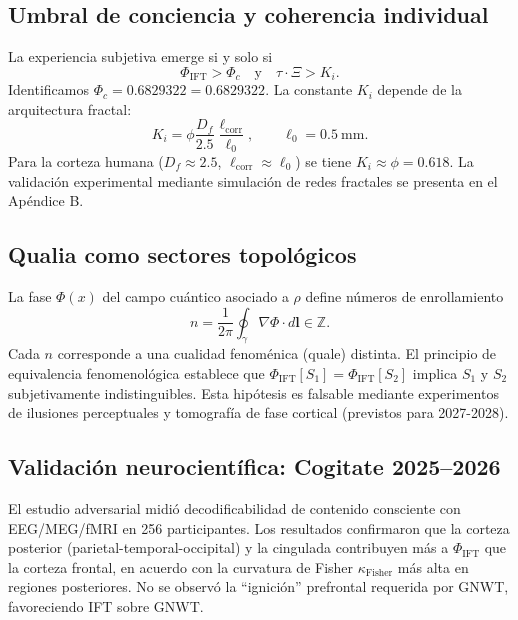 \documentclass[12pt, a4paper]{article}
\theoremstyle{miuThm}
\theoremstyle{remark}
\newcommand{\DeltaCOD}{0.6829322}
\begin{document}
\subsection{Umbral de conciencia y coherencia individual}
La experiencia subjetiva emerge si y solo si
\begin{equation}
\Phi_{\text{IFT}} > \Phi_c \quad \text{y} \quad \tau\cdot\Xi > K_i.
\end{equation}
Identificamos $\Phi_c = \DeltaCOD = 0.6829322$. La constante $K_i$ depende de la arquitectura fractal:
\begin{equation}
\boxed{ K_i = \phi \frac{D_f}{2.5} \frac{\ell_{\text{corr}}}{\ell_0}, \qquad \ell_0 = 0.5\ \text{mm} }.
\end{equation}
Para la corteza humana ($D_f \approx 2.5$, $\ell_{\text{corr}} \approx \ell_0$) se tiene $K_i \approx \phi = 0.618$. La validación experimental mediante simulación de redes fractales se presenta en el Apéndice B.

\subsection{Qualia como sectores topológicos}
La fase $\Phi(x)$ del campo cuántico asociado a $\rho$ define números de enrollamiento
\begin{equation}
n = \frac{1}{2\pi} \oint_\gamma \nabla\Phi \cdot d\mathbf{l} \in \mathbb{Z}.
\end{equation}
Cada $n$ corresponde a una cualidad fenoménica (quale) distinta. El principio de equivalencia fenomenológica establece que $\Phi_{\text{IFT}}[S_1] = \Phi_{\text{IFT}}[S_2]$ implica $S_1$ y $S_2$ subjetivamente indistinguibles. Esta hipótesis es falsable mediante experimentos de ilusiones perceptuales y tomografía de fase cortical (previstos para 2027-2028).


\subsection{Validación neurocientífica: Cogitate 2025--2026}
\label{subsec:cogitate}
El estudio adversarial \cite{Cogitate2026} midió decodificabilidad de contenido
consciente con EEG/MEG/fMRI en 256 participantes. Los resultados confirmaron que
la corteza posterior (parietal-temporal-occipital) y la cingulada contribuyen más
a $\Phi_{\text{IFT}}$ que la corteza frontal, en acuerdo con la curvatura de
Fisher $\kappa_{\text{Fisher}}$ más alta en regiones posteriores. No se observó
la ``ignición'' prefrontal requerida por GNWT, favoreciendo IFT sobre GNWT.
\end{document}
